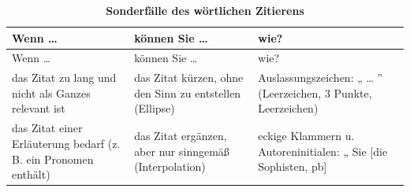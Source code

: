 \documentclass[]{book}
\theoremstyle{definition}
\theoremstyle{definition}
\theoremstyle{definition}
\theoremstyle{remark}
\begin{document}
\begin{longtable}[]{@{}lll@{}}
\caption{\textbf{\label{tab:zitieren3} Sonderfälle des wörtlichen
Zitierens}}\tabularnewline
\toprule
\begin{minipage}[b]{0.25\columnwidth}\raggedright\strut
Wenn \ldots{}\strut
\end{minipage} & \begin{minipage}[b]{0.34\columnwidth}\raggedright\strut
können Sie \ldots{}\strut
\end{minipage} & \begin{minipage}[b]{0.32\columnwidth}\raggedright\strut
wie?\strut
\end{minipage}\tabularnewline
\midrule
\endfirsthead
\toprule
\begin{minipage}[b]{0.25\columnwidth}\raggedright\strut
Wenn \ldots{}\strut
\end{minipage} & \begin{minipage}[b]{0.34\columnwidth}\raggedright\strut
können Sie \ldots{}\strut
\end{minipage} & \begin{minipage}[b]{0.32\columnwidth}\raggedright\strut
wie?\strut
\end{minipage}\tabularnewline
\midrule
\endhead
\begin{minipage}[t]{0.25\columnwidth}\raggedright\strut
das Zitat zu lang und nicht als Ganzes relevant ist\strut
\end{minipage} & \begin{minipage}[t]{0.34\columnwidth}\raggedright\strut
das Zitat kürzen, ohne den Sinn zu entstellen (Ellipse)\strut
\end{minipage} & \begin{minipage}[t]{0.32\columnwidth}\raggedright\strut
Auslassungszeichen: „ \ldots{} '' (Leerzeichen, 3 Punkte, Leerzeichen)
\vspace{-6mm}\strut
\end{minipage}\tabularnewline
\begin{minipage}[t]{0.25\columnwidth}\raggedright\strut
das Zitat einer Erläuterung bedarf (z. B. ein Pronomen enthält)\strut
\end{minipage} & \begin{minipage}[t]{0.34\columnwidth}\raggedright\strut
das Zitat ergänzen, aber nur sinngemäß (Interpolation)\strut
\end{minipage} & \begin{minipage}[t]{0.32\columnwidth}\raggedright\strut
eckige Klammern u. Autoreninitialen: „ Sie {[}die Sophisten, pb{]}

\end{minipage}
\end{longtable}
\end{document}
